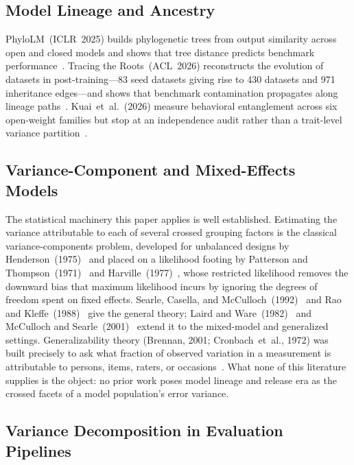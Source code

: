 \documentclass[journal]{IEEEtran}
\begin{document}
\subsection{Model Lineage and Ancestry}

PhyloLM~(ICLR~2025) builds phylogenetic trees from output similarity across open and closed models and shows that tree distance predicts benchmark performance~\cite{yax2025}. Tracing the Roots~(ACL~2026) reconstructs the evolution of datasets in post-training---83 seed datasets giving rise to 430 datasets and 971 inheritance edges---and shows that benchmark contamination propagates along lineage paths~\cite{li2028}. Kuai~et~al.~(2026) measure behavioral entanglement across six open-weight families but stop at an independence audit rather than a trait-level variance partition~\cite{kuai2026}.

\subsection{Variance-Component and Mixed-Effects Models}

The statistical machinery this paper applies is well established. Estimating the variance attributable to each of several crossed grouping factors is the classical variance-components problem, developed for unbalanced designs by Henderson~(1975)~\cite{henderson1975} and placed on a likelihood footing by Patterson and Thompson~(1971)~\cite{patterson1971} and Harville~(1977)~\cite{harville1977}, whose restricted likelihood removes the downward bias that maximum likelihood incurs by ignoring the degrees of freedom spent on fixed effects. Searle, Casella, and McCulloch~(1992)~\cite{searle1992} and Rao and Kleffe~(1988)~\cite{rao1988} give the general theory; Laird and Ware~(1982)~\cite{laird1982} and McCulloch and Searle~(2001)~\cite{mcculloch2001} extend it to the mixed-model and generalized settings. Generalizability theory (Brennan, 2001; Cronbach~et~al., 1972) was built precisely to ask what fraction of observed variation in a measurement is attributable to persons, items, raters, or occasions~\cite{brennan2001,cronbach1972}. What none of this literature supplies is the object: no prior work poses model lineage and release era as the crossed facets of a model population's error variance.

\subsection{Variance Decomposition in Evaluation Pipelines}
\end{document}
